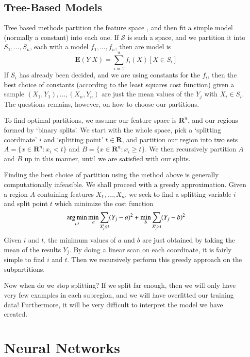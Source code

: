 \section{Tree-Based Models}

Tree based methods partition the feature space , and then fit a simple model (normally a constant) into each one. If $\mathcal{S}$ is such a space, and we partition it into $S_1, \dots, S_n$, each with a model $f_1, \dots, f_n$, then are model is
%
\[ \mathbf{E}(Y|X) = \sum_{i = 1}^n f_i(X) [X \in S_i] \]
%
If $S_i$ has already been decided, and we are using constants for the $f_i$, then the best choice of constants (according to the least squares cost function) given a sample $(X_1, Y_1), \dots, (X_n, Y_n)$ are just the mean values of the $Y_j$ with $X_i \in S_i$. The questions remains, however, on how to choose our partitions.

To find optimal partitions, we assume our feature space is $\mathbf{R}^n$, and our regions formed by `binary splits'. We start with the whole space, pick a `splitting coordinate' $i$ and `splitting point' $t \in \mathbf{R}$, and partition our region into two sets $A = \{ x \in \mathbf{R}^n : x_i < t \}$ and $B = \{ x \in \mathbf{R}^n : x_i \geq t \}$. We then recursively partition $A$ and $B$ up in this manner, until we are satisfied with our splits.

Finding the best choice of partition using the method above is generally computationally infeasible. We shall proceed with a greedy approximation. Given a region $A$ containing features $X_1, \dots, X_n$, we seek to find a splitting variable $i$ and split point $t$ which minimize the cost function
%
\[ \operatorname*{arg\,min}_{i,t} \min_a \sum_{X_j^i \leq t} (Y_j - a)^2 + \min_b \sum_{X_j^i > t} (Y_j - b)^2 \]
%
Given $i$ and $t$, the minimum values of $a$ and $b$ are just obtained by taking the mean of the results $Y_j$. By doing a linear scan on each coordinate, it is fairly simple to find $i$ and $t$. Then we recursively perform this greedy approach on the subpartitions.

Now when do we stop splitting? If we split far enough, then we will only have very few examples in each subregion, and we will have overfitted our training data! Furthermore, it will be very difficult to interpret the model we have created.

\chapter{Neural Networks}

